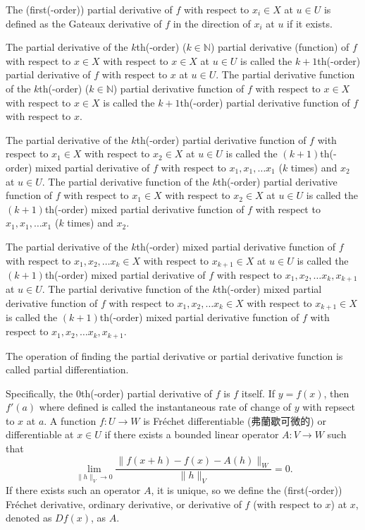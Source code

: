 \documentclass[a4paper,12pt]{report}
\begin{document}
\begin{itemize}
\begin{itemize}
The (first(-order)) partial derivative of $f$ with respect to $x_i\in X$ at $u\in U$ is defined as the Gateaux derivative of $f$ in the direction of $x_i$ at $u$ if it exists.

The partial derivative of the $k$th(-order) ($k\in\mathbb{N}$) partial derivative (function) of $f$ with respect to $ x \in X$ with respect to $ x \in X$ at $u\in U$ is called the $k+1$th(-order) partial derivative of $f$ with respect to $ x$ at $u\in U$. The partial derivative function of the $k$th(-order) ($k\in\mathbb{N}$) partial derivative function of $f$ with respect to $ x \in X$ with respect to $ x \in X$ is called the $k+1$th(-order) partial derivative function of $f$ with respect to $ x$.

The partial derivative of the $k$th(-order) partial derivative function of $f$ with respect to $ x_1\in X$ with respect to $ x_2\in X$ at $u\in U$ is called the $(k+1)$th(-order) mixed partial derivative of $f$ with respect to $ x_1, x_1,\dots  x_1$ ($k$ times) and $ x_2$ at $u\in U$. The partial derivative function of the $k$th(-order) partial derivative function of $f$ with respect to $ x_1\in X$ with respect to $ x_2\in X$ at $u\in U$ is called the $(k+1)$th(-order) mixed partial derivative function of $f$ with respect to $ x_1, x_1,\dots  x_1$ ($k$ times) and $ x_2$.

The partial derivative of the $k$th(-order) mixed partial derivative function of $f$ with respect to $ x_1, x_2,\dots  x_k\in X$ with respect to $ x_{k+1}\in X$ at $u\in U$ is called the $(k+1)$th(-order) mixed partial derivative of $f$ with respect to $ x_1, x_2,\dots  x_k, x_{k+1}$ at $u\in U$. The partial derivative function of the $k$th(-order) mixed partial derivative function of $f$ with respect to $ x_1, x_2,\dots  x_k\in X$ with respect to $ x_{k+1}\in X$ is called the $(k+1)$th(-order) mixed partial derivative function of $f$ with respect to $ x_1, x_2,\dots  x_k, x_{k+1}$.

The operation of finding the partial derivative or partial derivative function is called partial differentiation.

Specifically, the $0$th(-order) partial derivative of $f$ is $f$ itself.
If $y=f(x)$, then $f'(a)$ where defined is called the instantaneous rate of change of $y$ with repsect to $x$ at $a$.
A function $f\colon U\to W$ is Fréchet differentiable (弗蘭歇可微的) or differentiable at $x\in U$ if there exists a bounded linear operator $A\colon V\to W$ such that
\[\lim_{\|h\|_V\to 0}\frac{\|f(x+h)-f(x)-A(h)\|_W}{\|h\|_V}=0.\]
If there exists such an operator $A$, it is unique, so we define the (first(-order)) Fréchet derivative, ordinary derivative, or derivative of $f$ (with respect to $x$) at $x$, denoted as $Df(x)$, as $A$.


\end{itemize}
\end{itemize}
\end{document}
